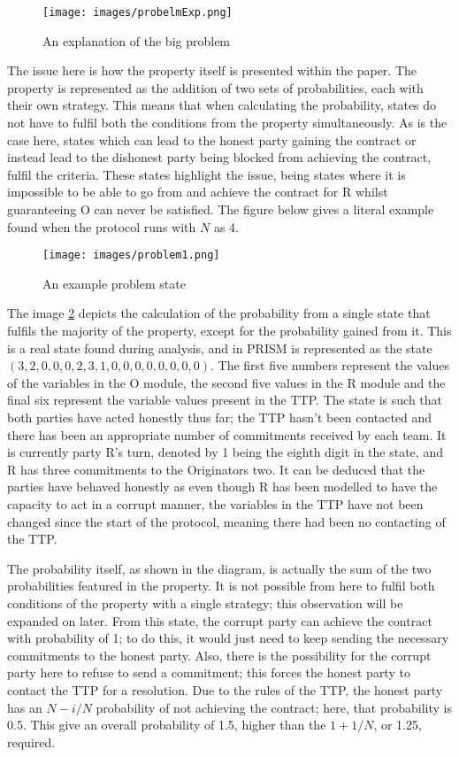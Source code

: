 \documentclass{l4proj}
\begin{document}
\begin{figure}[ht!]
\centering
\texttt{[image: images/probelmExp.png]}
\caption{An explanation of the big problem}
\label{finalProblem}
\end{figure}

The issue here is how the property itself is presented within the paper. The property is represented as the addition of two sets of probabilities, each with their own strategy. This means that when calculating the probability, states do not have to fulfil both the conditions from the property simultaneously. As is the case here, states which can lead to the honest party gaining the contract or instead lead to the dishonest party being blocked from achieving the contract, fulfil the criteria. These states highlight the issue, being states where it is impossible to be able to go from and achieve the contract for R whilst guaranteeing O can never be satisfied. The figure below gives a literal example found when the protocol runs with $N$ as 4.

\begin{figure}[ht!]
\centering
\texttt{[image: images/problem1.png]}
\caption{An example problem state}
\label{problemState}
\end{figure}

The image \ref{problemState} depicts the calculation of the probability from a single state that fulfils the majority of the property, except for the probability gained from it. This is a real state found during analysis, and in PRISM is represented as the state $(3,2,0,0,0,2,3,1,0,0,0,0,0,0,0,0)$. The first five numbers represent the values of the variables in the O module, the second five values in the R module and the final six represent the variable values present in the TTP. The state is such that both parties have acted honestly thus far; the TTP hasn't been contacted and there has been an appropriate number of commitments received by each team. It is currently party R's turn, denoted by 1 being the eighth digit in the state, and R has three commitments to the Originators two. It can be deduced that the parties have behaved honestly as even though R has been modelled to have the capacity to act in a corrupt manner, the variables in the TTP have not been changed since the start of the protocol, meaning there had been no contacting of the TTP.

The probability itself, as shown in the diagram, is actually the sum of the two probabilities featured in the property. It is not possible from here to fulfil both conditions of the property with a single strategy; this observation will be expanded on later. From this state, the corrupt party can achieve the contract with probability of 1; to do this, it would just need to keep sending the necessary commitments to the honest party. Also, there is the possibility for the corrupt party here to refuse to send a commitment; this forces the honest party to contact the TTP for a resolution. Due to the rules of the TTP, the honest party has an $N-i/N$ probability of not achieving the contract; here, that probability is 0.5. This give an overall probability of 1.5, higher than the $1+1/N$, or 1.25, required.
\end{document}
